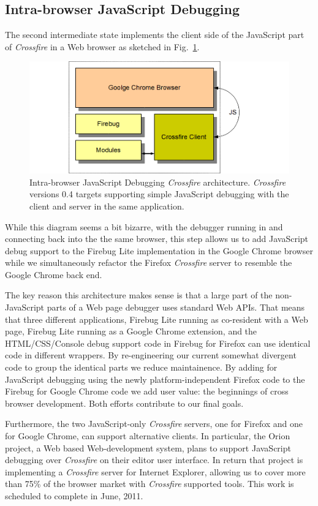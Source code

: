 \subsection{Intra-browser JavaScript Debugging}
The second intermediate state implements the client side of the JavaScript part of \textit{Crossfire} in
a Web browser as sketched in Fig.~\ref{fig:fbugChrome}.
\begin{figure}[htp]
  \includegraphics  [width = 86 mm] {figures/fbugChrome.png}
  \caption{Intra-browser JavaScript Debugging \textit{Crossfire} architecture.
\textit{Crossfire} versions 0.4 targets supporting simple JavaScript debugging with the client and server in the same application.}
 \label{fig:fbugChrome}
\end{figure}
While this diagram seems a bit bizarre, with the
debugger running in and connecting back into the the same browser, this step allows us to add JavaScript debug
support to the Firebug Lite implementation in the Google Chrome browser while we simultaneously refactor
the Firefox  \textit{Crossfire} server to resemble the Google Chrome back end.

The key reason this architecture makes sense is that a large part of the non-JavaScript parts of a Web page
debugger uses standard Web APIs. That  means that three different applications, Firebug Lite running as co-resident with a Web page,
Firebug Lite running as a Google Chrome extension,  and the HTML/CSS/Console debug support code in Firebug
for Firefox can use identical code in different wrappers. By re-engineering our current somewhat divergent code
to group the identical parts we reduce maintainence. By adding for JavaScript debugging using the newly platform-independent Firefox code to the Firebug for Google Chrome code we add user value: the beginnings of cross browser development. Both efforts contribute to our final goals.

Furthermore, the two JavaScript-only \textit{Crossfire} servers, one for Firefox and one for Google Chrome, can support
alternative clients. In particular, the Orion project, a Web based Web-development system, plans to support
JavaScript debugging over \textit{Crossfire} on their editor user interface. In
return that project is implementing a \textit{Crossfire} server for Internet Explorer, allowing us to cover more than 75\% of the browser market with \textit{Crossfire} supported tools.
This work is scheduled to complete in June, 2011.

